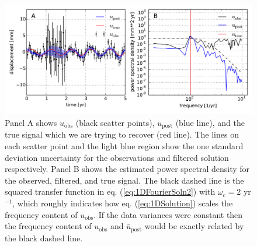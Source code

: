 \documentclass[10pt,a4paper]{article}
\begin{document}
\begin{figure}
\includegraphics[scale=0.75]{figures/fig1}
\caption{Panel A shows $u_\mathrm{obs}$ (black scatter points), $u_\mathrm{post}$ (blue line), and the true signal which we are trying to recover (red line).  The lines on each scatter point and the light blue region show the one standard deviation uncertainty for the observations and filtered solution respectively. Panel B shows the estimated power spectral density for the observed, filtered, and true signal.  The black dashed line is the squared transfer function in eq. (\ref{eq:1DFourierSoln2}) with $\omega_c=2$ yr$^{-1}$, which roughly indicates how eq. (\ref{eq:1DSolution}) scales the frequency content of $u_\mathrm{obs}$.  If the data variances were constant then the frequency content of $u_\mathrm{obs}$ and $\bar{u}_\mathrm{post}$ would be exactly related by the black dashed line.}   
\label{fig:Demo1}
\end{figure}
\end{document}
